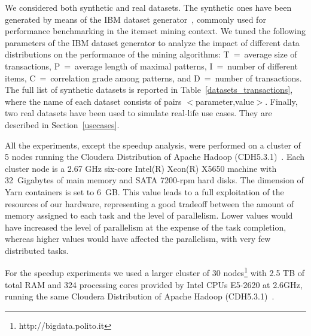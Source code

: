 \documentclass[preprint,review,12pt]{elsarticle}
\begin{document}
We considered both synthetic and real datasets.
The synthetic ones have been
generated by means of the IBM dataset generator~\cite{Quest}, commonly used for performance benchmarking in the
itemset mining context.
We tuned the following parameters of the IBM dataset generator to analyze
the impact of different data distributions on the performance of the
mining algorithms:
T~=~average size of transactions,
P~=~average length of maximal patterns,
I~=~number of different items,
C~=~correlation grade among patterns, and
D~=~number of transactions.
The full list of synthetic datasets is reported in Table~\ref{datasets_transactions},
where the name of each dataset consists of pairs $<$parameter,value$>$.
Finally, two real datasets have been used to simulate real-life use cases.
They are described in Section~\ref{usecases}.

All the experiments, except the speedup analysis, 
were performed on a cluster of 5 nodes running the Cloudera
Distribution of Apache Hadoop (CDH5.3.1)~\cite{cloudera}.
Each cluster node is a 2.67 GHz six-core Intel(R) Xeon(R) X5650 machine
with 32~Gigabytes of main memory and SATA 7200-rpm hard disks.
The dimension of Yarn containers is set to 6~GB. This value leads to a
full exploitation of the resources of our hardware, representing a good
tradeoff between the amount of memory assigned to each task and the
level of parallelism.
Lower values would have increased the level of parallelism at the expense
of the task completion, whereas higher values would have affected
the parallelism, with very few distributed tasks.

For the speedup experiments we used a larger cluster of 30 nodes\footnote{http://bigdata.polito.it} 
with 2.5 TB of total RAM and 324 processing cores provided by Intel CPUs E5-2620 at 2.6GHz, 
running the same Cloudera Distribution of Apache Hadoop (CDH5.3.1)~\cite{cloudera}. 
\end{document}
